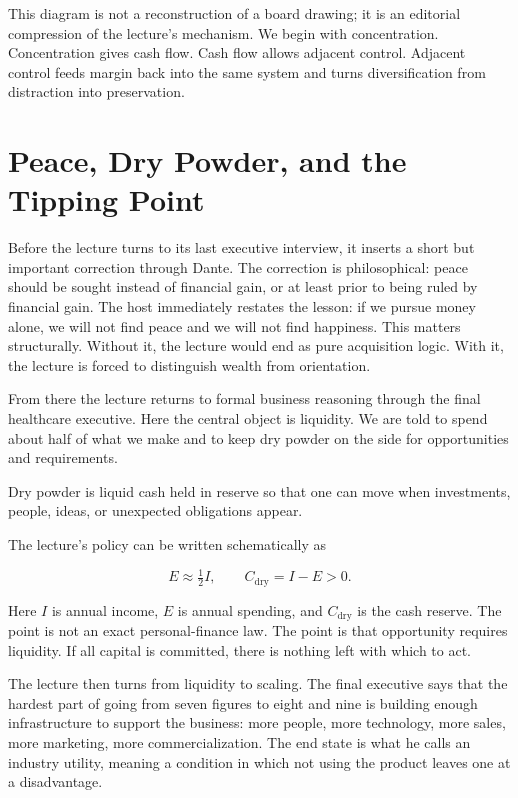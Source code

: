 This diagram is not a reconstruction of a board drawing; it is an editorial compression of the lecture's mechanism. We begin with concentration. Concentration gives cash flow. Cash flow allows adjacent control. Adjacent control feeds margin back into the same system and turns diversification from distraction into preservation.

\section{Peace, Dry Powder, and the Tipping Point}

Before the lecture turns to its last executive interview, it inserts a short but important correction through Dante. The correction is philosophical: peace should be sought instead of financial gain, or at least prior to being ruled by financial gain. The host immediately restates the lesson: if we pursue money alone, we will not find peace and we will not find happiness. This matters structurally. Without it, the lecture would end as pure acquisition logic. With it, the lecture is forced to distinguish wealth from orientation.

From there the lecture returns to formal business reasoning through the final healthcare executive. Here the central object is liquidity. We are told to spend about half of what we make and to keep dry powder on the side for opportunities and requirements.

\begin{definition}
Dry powder is liquid cash held in reserve so that one can move when investments, people, ideas, or unexpected obligations appear.
\end{definition}

The lecture's policy can be written schematically as

\begin{equation}
E \approx \tfrac12 I,\qquad C_{\mathrm{dry}} = I - E > 0.
\end{equation}

Here \(I\) is annual income, \(E\) is annual spending, and \(C_{\mathrm{dry}}\) is the cash reserve. The point is not an exact personal-finance law. The point is that opportunity requires liquidity. If all capital is committed, there is nothing left with which to act.

The lecture then turns from liquidity to scaling. The final executive says that the hardest part of going from seven figures to eight and nine is building enough infrastructure to support the business: more people, more technology, more sales, more marketing, more commercialization. The end state is what he calls an industry utility, meaning a condition in which not using the product leaves one at a disadvantage.

